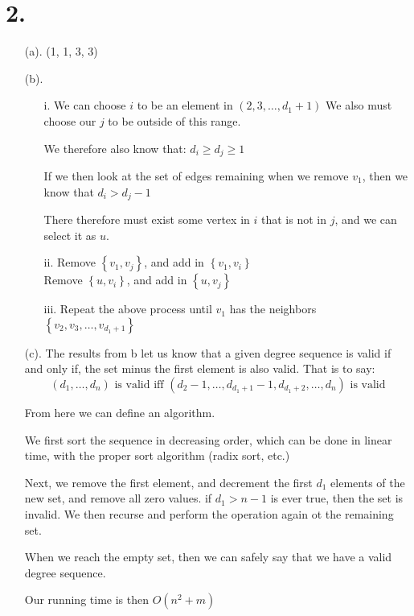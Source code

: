 \documentclass[11pt]{article}
\begin{document}
\section*{2.}
\begin{enumerate}
\item[(a).] (1, 1, 3, 3)
\item[(b).]
\begin{enumerate}
\item[i.] We can choose $i$ to be an element in $\left( 2,3, \dots, d_1 + 1
\right)$
We also must choose our $j$ to be outside of this range. 

We therefore also know that: $d_i \ge d_j \ge 1$

If we then look at the set of edges remaining when we remove $v_1$, then we know
that $d_i > d_j - 1$

There therefore must exist some vertex in $i$ that is not in $j$, and we can
select it as $u$.
\item[ii.] 
Remove $\left\{ v_1, v_j \right\}$, and add in $\left\{ v_1, v_i \right\}$\\
Remove $\left\{ u, v_i \right\}$, and add in $\left\{ u, v_j \right\}$

\item[iii.] 
Repeat the above process until $v_1$ has the neighbors $\left\{ v_2, v_3, \dots,
v_{d_1 + 1} \right\}$
\end{enumerate}
\item[(c).]
The results from b let us know that a given degree sequence is valid if and only
if, the set minus the first element is also valid. That is to say:
\begin{equation*}
(d_1, \dots, d_n) \text{ is valid iff } (d_2 - 1, \dots, d_{d_1+1}-1,
d_{d_1+2}, \dots, d_n) \text{ is valid}
\end{equation*}

From here we can define an algorithm.

We first sort the sequence in decreasing order, which can be done in linear
time, with the proper sort algorithm (radix sort, etc.)

Next, we remove the first element, and decrement the first $d_1$ elements of the
new set, and remove all zero values. if $d_1 > n-1$ is ever true, then the set
is invalid. We then recurse and perform the operation again ot the remaining
set. 

When we reach the empty set, then we can safely say that we have a valid degree
sequence.

Our running time is then $O(n^2 + m)$
\end{enumerate}
\newpage
\end{document}
